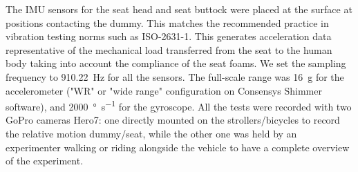 \documentclass[a4paper]{article}
\begin{document}
The IMU sensors for the seat head and seat buttock were placed at the surface at
positions contacting the dummy. This matches the recommended practice in
vibration testing norms such as ISO-2631-1. This generates acceleration data
representative of the mechanical load transferred from the seat to the human
body taking into account the compliance of the seat foams. We set the sampling
frequency to 910.22~\si{\hertz} for all the sensors. The full-scale range was
16~g for the accelerometer ("WR" or "wide range" configuration on Consensys
Shimmer software), and 2000~\si{\degree\per\second} for the gyroscope. All the
tests were recorded with two GoPro cameras Hero7: one directly mounted on the
strollers/bicycles to record the relative motion dummy/seat, while the other one
was held by an experimenter walking or riding alongside the vehicle to have a
complete overview of the experiment.
\end{document}
